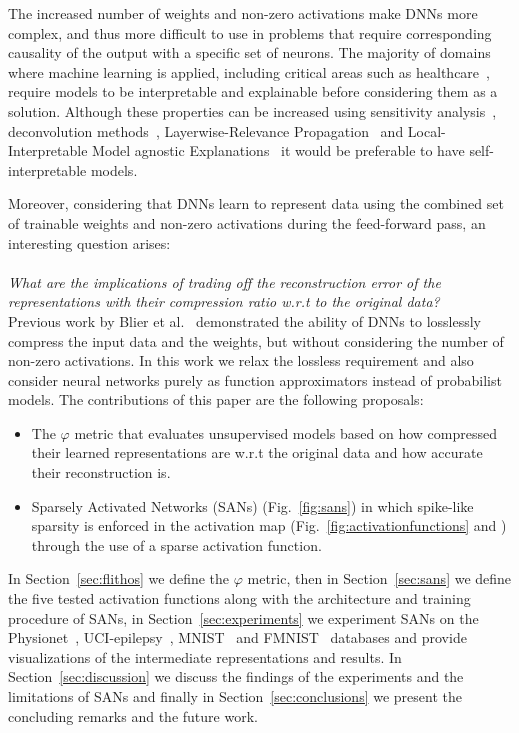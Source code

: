 \documentclass[journal]{IEEEtran}
\begin{document}
The increased number of weights and non-zero activations make DNNs more complex, and thus more difficult to use in problems that require corresponding causality of the output with a specific set of neurons.
The majority of domains where machine learning is applied, including critical areas such as healthcare~\cite{bizopoulos2019deep}, require models to be interpretable and explainable before considering them as a solution.
Although these properties can be increased using sensitivity analysis~\cite{simonyan2013deep}, deconvolution methods~\cite{zeiler2014visualizing}, Layerwise-Relevance Propagation~\cite{bach2015pixel} and Local-Interpretable Model agnostic Explanations~\cite{ribeiro2016should} it would be preferable to have self-interpretable models.

Moreover, considering that DNNs learn to represent data using the combined set of trainable weights and non-zero activations during the feed-forward pass, an interesting question arises:
\\\\
\indent\textit{What are the implications of trading off the reconstruction error of the representations with their compression ratio w.r.t to the original data?}
\\

Previous work by Blier et al.~\cite{blier2018description} demonstrated the ability of DNNs to losslessly compress the input data and the weights, but without considering the number of non-zero activations.
In this work we relax the lossless requirement and also consider neural networks purely as function approximators instead of probabilist models.
The contributions of this paper are the following proposals:
\begin{itemize}
	\item The $\varphi$ metric that evaluates unsupervised models based on how compressed their learned representations are w.r.t the original data and how accurate their reconstruction is.
	\item Sparsely Activated Networks (SANs) (Fig.~\ref{fig:sans}) in which spike-like sparsity is enforced in the activation map (Fig.~\ref{fig:activationfunctions} and ) through the use of a sparse activation function.
\end{itemize}

In Section~\ref{sec:flithos} we define the $\varphi$ metric, then in Section~\ref{sec:sans} we define the five tested activation functions along with the architecture and training procedure of SANs, in Section~\ref{sec:experiments} we experiment SANs on the Physionet~\cite{goldberger2000physiobank}, UCI-epilepsy~\cite{andrzejak2001indications}, MNIST~\cite{lecun1998gradient} and FMNIST~\cite{xiao2017fashion} databases and provide visualizations of the intermediate representations and results.
In Section~\ref{sec:discussion} we discuss the findings of the experiments and the limitations of SANs and finally in Section~\ref{sec:conclusions} we present the concluding remarks and the future work.
\end{document}
